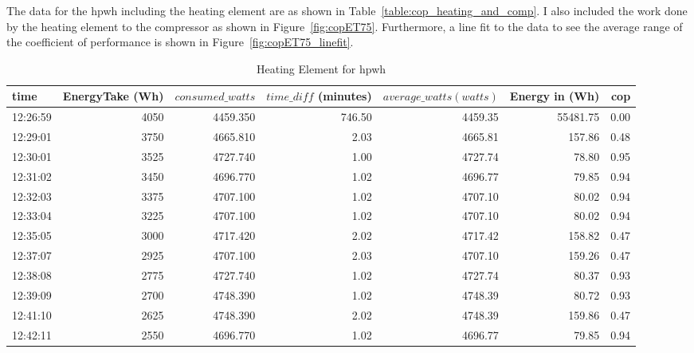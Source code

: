 The data for the \gls{hpwh} including the heating element are as shown in Table~\ref{table:cop_heating_and_comp}. I also included the work done by the heating element to the compressor as shown in Figure~\ref{fig:copET75}. Furthermore, a line fit to the data to see the average range of the coefficient of performance is shown in Figure~\ref{fig:copET75_linefit}.
\begin{table}[ht!]
\caption{Heating Element for \gls{hpwh}}
\begin{adjustbox}{max width=\textwidth}
\begin{tabular}{|l|r|r|r|r|r|r|}
\hline
    time &  EnergyTake (Wh) &  $consumed\_watts$ &  $time\_diff$ (minutes) &  $average\_watts (watts)$ &    Energy in (Wh) &   cop \\ \hline

12:26:59 &               4050 &        4459.350 &     746.50 &        4459.35 & 55481.75 &  0.00 \\ \hline
12:29:01 &               3750 &        4665.810 &       2.03 &        4665.81 &   157.86 &  0.48 \\ \hline
12:30:01 &               3525 &        4727.740 &       1.00 &        4727.74 &    78.80 &  0.95 \\ \hline
12:31:02 &               3450 &        4696.770 &       1.02 &        4696.77 &    79.85 &  0.94 \\ \hline
12:32:03 &               3375 &        4707.100 &       1.02 &        4707.10 &    80.02 &  0.94 \\ \hline
12:33:04 &               3225 &        4707.100 &       1.02 &        4707.10 &    80.02 &  0.94 \\ \hline
12:35:05 &               3000 &        4717.420 &       2.02 &        4717.42 &   158.82 &  0.47 \\ \hline
12:37:07 &               2925 &        4707.100 &       2.03 &        4707.10 &   159.26 &  0.47 \\ \hline
12:38:08 &               2775 &        4727.740 &       1.02 &        4727.74 &    80.37 &  0.93 \\ \hline
12:39:09 &               2700 &        4748.390 &       1.02 &        4748.39 &    80.72 &  0.93 \\ \hline
12:41:10 &               2625 &        4748.390 &       2.02 &        4748.39 &   159.86 &  0.47 \\ \hline
12:42:11 &               2550 &        4696.770 &       1.02 &        4696.77 &    79.85 &  0.94 \\ \hline

\end{tabular}
\end{adjustbox}
\end{table}

